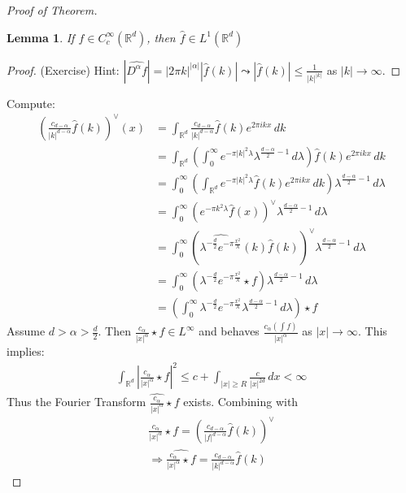 \documentclass{report}
\theoremstyle{tommy}
\newtheorem{lem}[defn]{Lemma}
\newcommand{\Rd}{\mathbb{R}^d}
\begin{document}
\begin{proof}[Proof of Theorem]
    \begin{lem}
      If \(f \in C_c^\infty(\Rd)\), then \(\hat f \in L^1(\mathbb{R}^d)\)
    \end{lem}

    \begin{proof}(Exercise)
      Hint: \(|\widehat{D^\alpha f}| = |2 \pi k|^{|\alpha|} |\hat f(k)| \leadsto |\hat f(k)| \le \frac{1}{|k|^{|k|}}\) as \(|k| \to \infty\).
    \end{proof}

    Compute:
    \begin{align*}
      \left(\frac{c_{d-\alpha}}{|k|^{d-\alpha}} \hat f(k)\right)^\lor (x) 
      &= \int_{\Rd} \frac{c_{d-\alpha}}{|k|^{d-\alpha}} \hat f(k) e^{2 \pi i k x} \, dk \\
      &= \int_{\Rd} \left(\int_0^\infty e^{-\pi |k|^2 \lambda} \lambda^{\frac{d-\alpha}{2}-1} \, d \lambda \right) \hat f (k) e^{2 \pi i k x} \, dk \\
      &= \int_0^\infty \left(\int_{\Rd} e^{-\pi |k|^2 \lambda} \hat f (k) e^{2 \pi i k x} \, dk \right) \lambda^{\frac{d-\alpha}{2}-1} \, d \lambda \\
      &= \int_0^\infty \left(e^{- \pi k^2 \lambda} \hat f(x)\right)^\lor \lambda^{\frac{d-\alpha}{2} - 1} \, d \lambda \\
      &= \int_0^\infty \left(\widehat{\lambda^{-\frac{d}{2}} e^{- \pi \frac{x^2}{\lambda}}}(k) \hat f(k)\right)^\lor \lambda^{\frac{d-\alpha}{2} - 1} \, d \lambda \\
      &= \int_0^\infty \left(\lambda^{- \frac{d}{2}} e^{- \pi \frac{x^2}{\lambda}} \star f \right) \lambda^{\frac{d-\alpha}{2} - 1} \, d \lambda \\
      &= \left(\int_0^\infty \lambda^{- \frac{d}{2}} e^{- \pi \frac{x^2}{\lambda}}\lambda^{\frac{d-\alpha}{2} - 1} \, d \lambda \right) \star f
    \end{align*}
    Assume \(d > \alpha > \frac{d}{2}\). Then \(\frac{c_\alpha}{|x|^\alpha} \star f \in L^\infty\) and behaves \(\frac{c_\alpha(\int f)}{|x|^\alpha}\) as \(|x| \to \infty\). This implies:
    \begin{align*}
      \int_{\mathbb{R}^d} \left| \frac{c_\alpha}{|x|^\alpha} \star f \right|^2 \le c + \int_{|x| \ge R} \frac{c}{|x|^{2d}} \, dx < \infty 
    \end{align*}
    Thus the Fourier Transform \(\widehat{\frac{c_\alpha}{|x|^\alpha}} \star f\) exists. Combining with 
    \begin{align*}
      \frac{c_\alpha}{|x|^\alpha} \star f = \left(\frac{c_{d-\alpha}}{|f|^{d-\alpha}} \hat f(k) \right)^\lor \\
      \Rightarrow \widehat{\frac{c_\alpha}{|x|^\alpha} \star f} = \frac{c_{d-\alpha}}{|k|^{d-\alpha}} \hat f (k)
    \end{align*}
  \end{proof}
  
\end{document}
